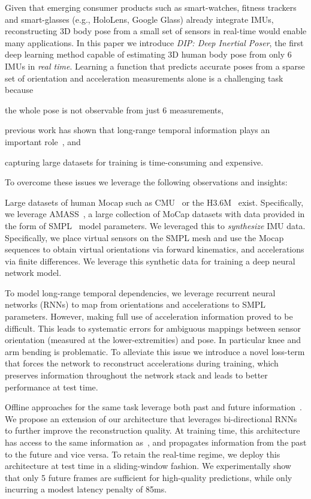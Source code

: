 \documentclass[acmtog]{acmart}
\begin{document}
Given that emerging consumer products such as smart-watches, fitness trackers and smart-glasses (e.g., HoloLens, Google Glass) already integrate IMUs,  reconstructing 3D body pose from a small set of sensors in real-time would enable many applications.
In this paper we introduce \emph{DIP: Deep Inertial Poser}, the first deep learning method capable of estimating 3D human body pose from only 6 IMUs in \emph{real time}. Learning a function that predicts accurate poses from  a sparse set of orientation and acceleration measurements alone is a challenging task because
\begin{inparaenum}[(i)]
	\item the whole pose is not observable from just 6 measurements, 
    \item previous work has shown that long-range temporal information plays an important role~\cite{von2017sparse}, and
    \item capturing large datasets for training is time-consuming and expensive.
\end{inparaenum}

To overcome these issues we leverage the following observations and insights: 
\begin{inparaenum}[(i)]
	\item Large  datasets of human Mocap such as CMU~ or the H3.6M~ exist. Specifically, we leverage AMASS~\cite{MoShPP}, a large collection of MoCap datasets with data provided in the form of SMPL~\cite{loper2015smpl} model parameters. We leveraged this to \emph{synthesize} IMU data. Specifically, we place virtual sensors on the SMPL mesh and use the Mocap sequences to obtain virtual orientations via forward kinematics, and accelerations via finite differences. We leverage this synthetic data for training a deep neural network model. 
    \item To model long-range temporal dependencies, we leverage recurrent neural networks (RNNs) to map from orientations and accelerations to SMPL parameters. However, making full use of acceleration information proved to be difficult. This leads to systematic errors for ambiguous mappings between sensor orientation (measured at the lower-extremities) and pose. In particular knee and arm bending is problematic. To alleviate this issue we introduce a novel loss-term that forces the network to reconstruct accelerations during training, which preserves information throughout the network stack and leads to better performance at test time. 
    \item Offline approaches for the same task leverage both past and future information~\cite{von2017sparse}. We propose an extension of our architecture that leverages bi-directional RNNs to further improve the reconstruction quality. At  training time, this architecture has access to the same information as~\cite{von2017sparse}, and propagates information from the past to the future and vice versa. To retain the real-time regime, we deploy this architecture at test time in a sliding-window fashion. We experimentally show that only 5 future frames are sufficient for high-quality predictions, while only incurring a modest latency penalty of 85ms.  
\end{inparaenum}
\end{document}
